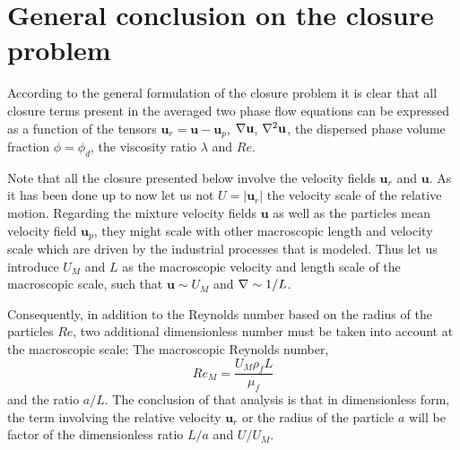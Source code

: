 


\section{General conclusion on the closure problem}

According to the general formulation of the closure problem it is clear that all closure terms present in the averaged two phase flow equations can be expressed as a function of the tensors $\textbf{u}_{r} =\textbf{u}- \textbf{u}_p$, $\mathbf{\nabla} \textbf{u}$, $\mathbf{\nabla}^2 \textbf{u}$, the dispersed phase volume fraction $\phi =\phi_d$, the viscosity ratio $\lambda$ and  $Re$. 

Note that all the closure presented below involve the velocity fields $\textbf{u}_r$ and $\textbf{u}$. 
As it has been done up to now let us not $U = |\textbf{u}_r|$ the velocity scale of the relative motion. 
Regarding the mixture velocity fields $\textbf{u}$ as well as the particles mean velocity field $\textbf{u}_p$, they might scale with other macroscopic length and velocity scale which are driven by the industrial processes that is modeled\citet{jackson1997locally}. 
Thus let us introduce $U_M$ and $L$ as the macroscopic velocity and length scale of the macroscopic scale, such that $\textbf{u}\sim U_M$ and $\mathbf{\nabla} \sim 1/L$. 

Consequently, in addition to the Reynolds number based on the radius of the particles $Re$, two additional dimensionless number must be taken into account at the macroscopic scale: The macroscopic Reynolds number,
\begin{equation*}
    Re_M = \frac{U_M \rho_f L}{\mu_f}
\end{equation*}
and the ratio $a/L$.
The conclusion of that analysis is that in dimensionless form, the term involving the relative velocity $\textbf{u}_r$ or the radius of the particle $a$ will be factor of the dimensionless ratio $L/a$ and $U/U_M$. 


